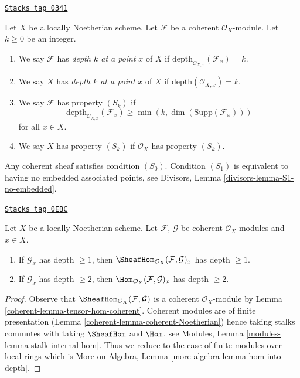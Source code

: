 \begin{definition}[Depth]
\label{coherent-definition-depth}
\href{https://stacks.math.columbia.edu/tag/0341}{\texttt{Stacks tag 0341}}

Let $X$ be a locally Noetherian scheme.
Let $\mathcal{F}$ be a coherent $\mathcal{O}_X$-module.
Let $k \geq 0$ be an integer.
\begin{enumerate}
\item We say $\mathcal{F}$ has {\it depth $k$ at a point}
$x$ of $X$ if $\text{depth}_{\mathcal{O}_{X, x}}(\mathcal{F}_x) = k$.
\item We say $X$ has {\it depth $k$ at a point} $x$ of $X$ if
$\text{depth}(\mathcal{O}_{X, x}) = k$.
\item We say $\mathcal{F}$ has property {\it $(S_k)$} if
$$
\text{depth}_{\mathcal{O}_{X, x}}(\mathcal{F}_x)
\geq \min(k, \dim(\text{Supp}(\mathcal{F}_x)))
$$
for all $x \in X$.
\item We say $X$ has property {\it $(S_k)$} if $\mathcal{O}_X$ has
property $(S_k)$.
\end{enumerate}
\end{definition}

Any coherent sheaf satisfies condition $(S_0)$.
Condition $(S_1)$ is equivalent to having no embedded associated
points, see Divisors, Lemma \ref{divisors-lemma-S1-no-embedded}.

\begin{lemma}
\label{coherent-lemma-hom-into-depth}
\href{https://stacks.math.columbia.edu/tag/0EBC}{\texttt{Stacks tag 0EBC}}

Let $X$ be a locally Noetherian scheme. Let $\mathcal{F}$, $\mathcal{G}$
be coherent $\mathcal{O}_X$-modules and $x \in X$.
\begin{enumerate}
\item If $\mathcal{G}_x$ has depth $\geq 1$, then
$\SheafHom_{\mathcal{O}_X}(\mathcal{F}, \mathcal{G})_x$
has depth $\geq 1$.
\item If $\mathcal{G}_x$ has depth $\geq 2$, then
$\Hom_{\mathcal{O}_X}(\mathcal{F}, \mathcal{G})_x$ has depth $\geq 2$.
\end{enumerate}
\end{lemma}

\begin{proof}

Observe that $\SheafHom_{\mathcal{O}_X}(\mathcal{F}, \mathcal{G})$ is
a coherent $\mathcal{O}_X$-module by Lemma \ref{coherent-lemma-tensor-hom-coherent}.
Coherent modules are of finite presentation
(Lemma \ref{coherent-lemma-coherent-Noetherian}) hence taking stalks commutes
with taking $\SheafHom$ and $\Hom$, see
Modules, Lemma \ref{modules-lemma-stalk-internal-hom}.
Thus we reduce to the case of finite modules over local
rings which is More on Algebra, Lemma \ref{more-algebra-lemma-hom-into-depth}.
\end{proof}

